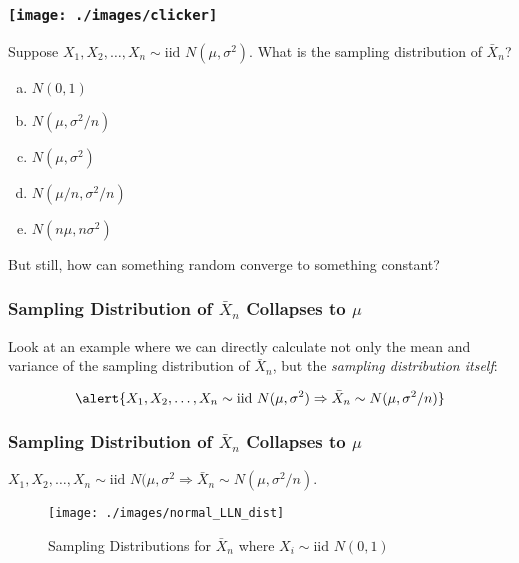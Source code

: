 \begin{frame}
\frametitle{\texttt{[image: ./images/clicker]}}
Suppose $X_1, X_2, \hdots, X_n \sim \mbox{iid } N(\mu,\sigma^2)$. What is the sampling distribution of $\bar{X}_n$?

\begin{enumerate}[(a)]
\item $N(0,1)$
\item $N(\mu, \sigma^2/n)$
\item $N(\mu, \sigma^2)$
\item $N(\mu/n, \sigma^2/n)$
\item $N(n\mu, n\sigma^2)$
\end{enumerate}

\end{frame}

\begin{frame}
\huge\begin{center} But still, how can something random converge to something constant? \end{center}
\end{frame}

\begin{frame}
\frametitle{Sampling Distribution of $\bar{X}_n$ Collapses to $\mu$}
Look at an example where we can directly calculate not only the mean and variance of the sampling distribution of $\bar{X}_n$, but the \emph{sampling distribution itself}:

\vspace{1em}
$$\alert{X_1, X_2, \hdots, X_n \sim \mbox{iid } N(\mu,\sigma^2) \Rightarrow \bar{X}_n \sim N(\mu, \sigma^2/n)}$$


\end{frame}






\begin{frame}
\frametitle{Sampling Distribution of $\bar{X}_n$ Collapses to $\mu$}
\alert{$X_1, X_2, \hdots, X_n \sim \mbox{iid } N(\mu,\sigma^2 \Rightarrow \bar{X}_n \sim N(\mu, \sigma^2/n)$.} \\
\begin{figure}
\centering
\texttt{[image: ./images/normal\_LLN\_dist]}
\caption{Sampling Distributions for $\bar{X}_n$ where $X_i \sim \mbox{iid } N(0,1)$}
\end{figure}

\end{frame}




